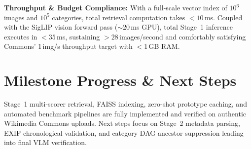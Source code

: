 \documentclass[10pt,a4paper,twocolumn]{article}
\begin{document}
\textbf{Throughput \& Budget Compliance:}
With a full-scale vector index of $10^6$ images and $10^5$ categories, total retrieval computation takes $<10$\,ms. Coupled with the SigLIP vision forward pass ($\sim 20$\,ms GPU), total Stage~1 inference executes in $<35$\,ms, sustaining $>28$\,images/second and comfortably satisfying Commons' 1\,img/s throughput target with $<1$\,GB RAM.

\section{Milestone Progress \& Next Steps}
Stage~1 multi-scorer retrieval, FAISS indexing, zero-shot prototype caching, and automated benchmark pipelines are fully implemented and verified on authentic Wikimedia Commons uploads. Next steps focus on Stage~2 metadata parsing, EXIF chronological validation, and category DAG ancestor suppression leading into final VLM verification.
\end{document}
